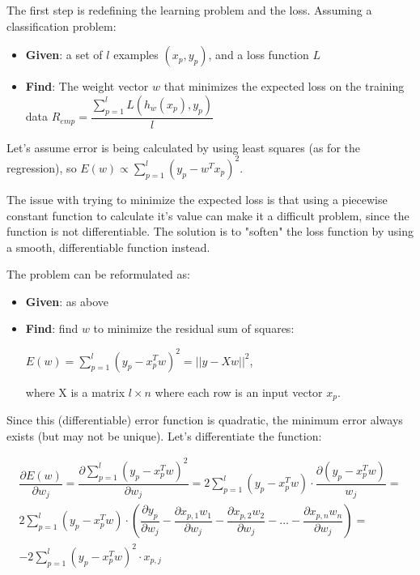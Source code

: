 The first step is redefining the learning problem and the loss. Assuming a classification problem:

\begin{itemize}
    \item \textbf{Given}: a set of $l$ examples $(x_p, y_p)$, and a loss function $L$

    \item \textbf{Find}: The weight vector $w$ that minimizes the expected loss on the training data $R_{emp} = \dfrac{\sum_{p=1}^l L(h_w(x_p), y_p)}{l}$
\end{itemize}
Let's assume error is being calculated by using least squares (as for the regression), so $E(w) \propto \sum_{p=1}^l (y_p - w^Tx_p)^2$.

The issue with trying to minimize the expected loss is that using a piecewise constant function to calculate it's value can make it a difficult problem, since the function is not differentiable. The solution is to "soften" the loss function by using a smooth, differentiable function instead.

The problem can be reformulated as:

\begin{itemize}
    \item \textbf{Given}: as above

    \item \textbf{Find}: find $w$ to minimize the residual sum of squares:

    $E(w) = \sum_{p=1}^l (y_p - x_p^Tw)^2 = ||y-Xw||^2$,

    where X is a matrix $l \times n$ where each row is an input vector $x_p$.
\end{itemize}

Since this (differentiable) error function is quadratic, the minimum error always exists (but may not be unique). Let's differentiate the function:

\begin{equation*}
\begin{gathered}
    \dfrac{\partial E(w)}{\partial w_j} = \dfrac{\partial \sum_{p=1}^l (y_p - x_p^Tw)^2}{\partial w_j} = 2\sum_{p=1}^l (y_p - x_p^Tw) \cdot \dfrac{\partial (y_p - x_p^Tw)}{w_j} = \\ 2\sum_{p=1}^l (y_p - x_p^Tw) \cdot (\dfrac{\partial y_p}{\partial w_j} - \dfrac{\partial x_{p,1}w_1}{\partial w_j} - \dfrac{\partial x_{p,2}w_2}{\partial w_j} - \dots - \dfrac{\partial x_{p,n}w_n}{\partial w_j}) = \\ \boxed{-2\sum_{p=1}^l (y_p - x_p^Tw)^2 \cdot x_{p,j}}
\end{gathered}
\end{equation*}

